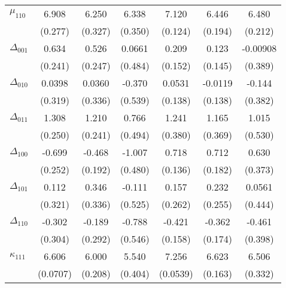 \begin{table}[htbp]
\begin{tabular}{l*{6}{c}}
$\mu_{110}$&    6.908\sym{***}&    6.250\sym{***}&    6.338\sym{***}&    7.120\sym{***}&    6.446\sym{***}&    6.480\sym{***}\\
          &  (0.277)         &  (0.327)         &  (0.350)         &  (0.124)         &  (0.194)         &  (0.212)         \\
$\Delta_{001}$&    0.634\sym{***}&    0.526\sym{**} &   0.0661         &    0.209         &    0.123         & -0.00908         \\
          &  (0.241)         &  (0.247)         &  (0.484)         &  (0.152)         &  (0.145)         &  (0.389)         \\
$\Delta_{010}$&   0.0398         &   0.0360         &   -0.370         &   0.0531         &  -0.0119         &   -0.144         \\
          &  (0.319)         &  (0.336)         &  (0.539)         &  (0.138)         &  (0.138)         &  (0.382)         \\
$\Delta_{011}$&    1.308\sym{***}&    1.210\sym{***}&    0.766         &    1.241\sym{***}&    1.165\sym{***}&    1.015\sym{*}  \\
          &  (0.250)         &  (0.241)         &  (0.494)         &  (0.380)         &  (0.369)         &  (0.530)         \\
$\Delta_{100}$&   -0.699\sym{***}&   -0.468\sym{**} &   -1.007\sym{**} &    0.718\sym{***}&    0.712\sym{***}&    0.630\sym{*}  \\
          &  (0.252)         &  (0.192)         &  (0.480)         &  (0.136)         &  (0.182)         &  (0.373)         \\
$\Delta_{101}$&    0.112         &    0.346         &   -0.111         &    0.157         &    0.232         &   0.0561         \\
          &  (0.321)         &  (0.336)         &  (0.525)         &  (0.262)         &  (0.255)         &  (0.444)         \\
$\Delta_{110}$&   -0.302         &   -0.189         &   -0.788         &   -0.421\sym{***}&   -0.362\sym{**} &   -0.461         \\
          &  (0.304)         &  (0.292)         &  (0.546)         &  (0.158)         &  (0.174)         &  (0.398)         \\
$\kappa_{111}$&    6.606\sym{***}&    6.000\sym{***}&    5.540\sym{***}&    7.256\sym{***}&    6.623\sym{***}&    6.506\sym{***}\\
          & (0.0707)         &  (0.208)         &  (0.404)         & (0.0539)         &  (0.163)         &  (0.332)         \\

\end{tabular}
\end{table}
